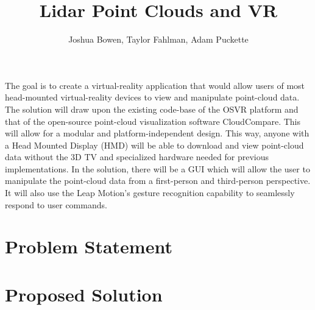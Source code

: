 \documentclass{article}
\begin{document}
\title{Lidar Point Clouds and VR}
\author{Joshua Bowen, Taylor Fahlman, Adam Puckette}

\maketitle

\abstract

The goal is to create a virtual-reality application that would allow users of most head-mounted virtual-reality devices to view and manipulate point-cloud data. The solution will draw upon the existing code-base of the OSVR platform and that of the open-source point-cloud visualization software CloudCompare. This will allow for a modular and platform-independent design. This way, anyone with a Head Mounted Display (HMD) will be able to download and view point-cloud data without the 3D TV and specialized hardware needed for previous implementations. In the solution, there will be a GUI which will allow the user to manipulate the point-cloud data from a first-person and third-person perspective. It will also use the Leap Motion's gesture recognition capability to seamlessly respond to user commands.


\section*{Problem Statement}

\section*{Proposed Solution}
\end{document}
